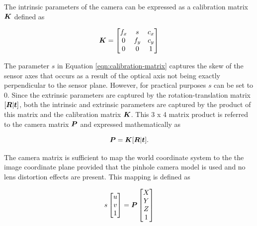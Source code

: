 The intrinsic parameters of the camera can be expressed as a calibration matrix $\bm{K}$ defined as

\begin{equation}
	\bm{K}=
	\begin{bmatrix}
		f_x & s & c_x \\ 
		0 & f_y & c_y \\ 
		0 & 0 & 1
	\end{bmatrix}
	\label{eqn:calibration-matrix}
\end{equation}

The parameter $s$ in Equation \ref{eqn:calibration-matrix} captures the skew of the sensor axes that occurs as a result of the optical axis not being exactly perpendicular to the sensor plane. However, for practical purposes $s$ can be set to 0. Since the extrinsic parameters are captured by the rotation-translation matrix $[\bm{R}|\bm{t}]$, both the intrinsic and extrinsic parameters are captured by the product of this matrix and the calibration matrix $\bm{K}$. This 3 x 4 matrix product is referred to the camera matrix $\bm{P}$ and expressed mathematically as

\begin{equation}
	\bm{P}=\bm{K}[\bm{R}|\bm{t}].
	\label{eqn:camera-matrix}
\end{equation}

The camera matrix is sufficient to map the world coordinate system to the the image coordinate plane provided that the pinhole camera model is used and no lens distortion effects are present. This mapping is defined as

\begin{equation}
	s
	\begin{bmatrix}
		u \\ 
		v \\ 
		1
	\end{bmatrix}
	=
	\bm{P}
	\begin{bmatrix}
		X \\ 
		Y \\ 
		Z \\
		1
	\end{bmatrix}
	\label{eqn:pinhole-camera-mapping}
\end{equation}

